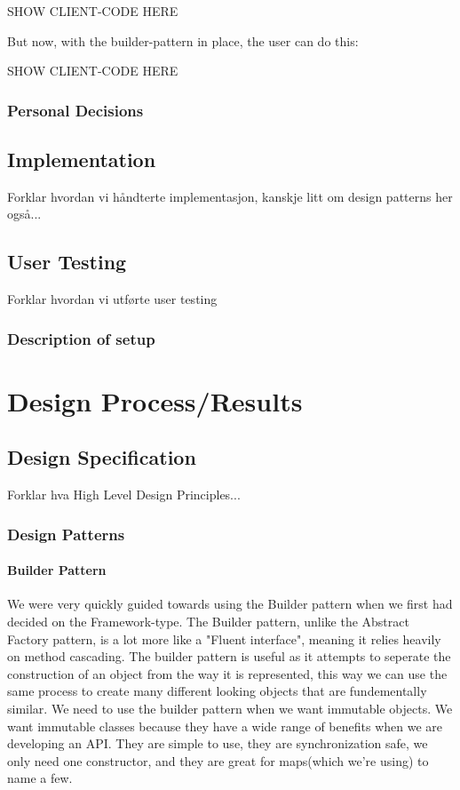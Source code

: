 \documentclass[12pt]{article}
\begin{document}
        SHOW CLIENT-CODE HERE

        But now, with the builder-pattern in place, the user can do this:

        SHOW CLIENT-CODE HERE

        \subsubsection{Personal Decisions}



    \subsection{Implementation}
    Forklar hvordan vi håndterte implementasjon, kanskje litt om design patterns her også...

    \subsection{User Testing}
    Forklar hvordan vi utførte user testing

        \subsubsection{Description of setup}

\section{Design Process/Results}

    \subsection{Design Specification}
    Forklar hva High Level Design Principles...

        \subsubsection{Design Patterns}

        \paragraph{Builder Pattern}
        We were very quickly guided towards using the Builder pattern when we first had decided on the Framework-type. The Builder pattern, unlike the Abstract Factory pattern, is a lot more like a "Fluent interface", meaning it relies heavily on method cascading.
        The builder pattern is useful as it attempts to seperate the construction of an object from the way it is represented, this way we can use the same process to create many different looking objects that are fundementally similar.
        We need to use the builder pattern when we want immutable objects. We want immutable classes because they have a wide range of benefits when we are developing an API. They are simple to use, they are synchronization safe, we only need one constructor, and they are great for maps(which we're using) to name a few.
\end{document}
